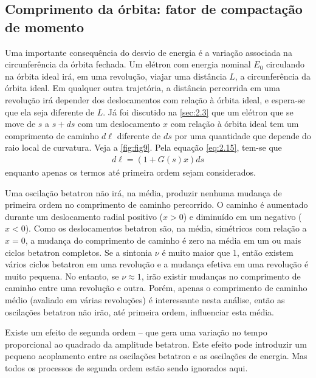 \subsection{Comprimento da órbita: fator de compactação de momento}\label{sec:3.2}
Uma importante consequência do desvio de energia é a variação associada na circunferência da órbita fechada. Um elétron com energia nominal $E_0$ circulando na órbita ideal irá, em uma revolução, viajar uma distância $L$, a circunferência da órbita ideal. Em qualquer outra trajetória, a distância percorrida em uma revolução irá depender dos deslocamentos com relação à órbita ideal, e espera-se que ela seja diferente de $L$. Já foi discutido na \autoref{sec:2.3} que um elétron que se move de $s$ a $s + ds$ com um deslocamento $x$ com relação à órbita ideal tem um comprimento de caminho $d\ell$ diferente de $ds$ por uma quantidade que depende do raio local de curvatura. Veja a \autoref{fig:fig9}. Pela equação \eqref{eq:2.15}, tem-se que
\begin{align}
	d\ell = (1+G(s)x)ds\label{eq:3.7}
\end{align}
enquanto apenas os termos até primeira ordem sejam considerados.

Uma oscilação betatron não irá, na média, produzir nenhuma mudança de primeira ordem no comprimento de caminho percorrido. O caminho é aumentado durante um deslocamento radial positivo ($x>0$) e diminuído em um negativo ($x<0$). Como os deslocamentos betatron são, na média, simétricos com relação a $x=0$, a mudança do comprimento de caminho é zero na média em um ou mais ciclos betatron completos. Se a sintonia $\nu$ é muito maior que 1, então existem vários ciclos betatron em uma revolução e a mudança efetiva em uma revolução é muito pequena. No entanto, se $\nu \approx 1$, irão existir mudanças no comprimento de caminho entre uma revolução e outra. Porém, apenas o comprimento de caminho médio (avaliado em várias revoluções) é interessante nesta análise, então as oscilações betatron não irão, até primeira ordem, influenciar esta média.

Existe um efeito de segunda ordem -- que gera uma variação no tempo proporcional ao quadrado da amplitude betatron. Este efeito pode introduzir um pequeno acoplamento entre as oscilações betatron e as oscilações de energia. Mas todos os processos de segunda ordem estão sendo ignorados aqui.

